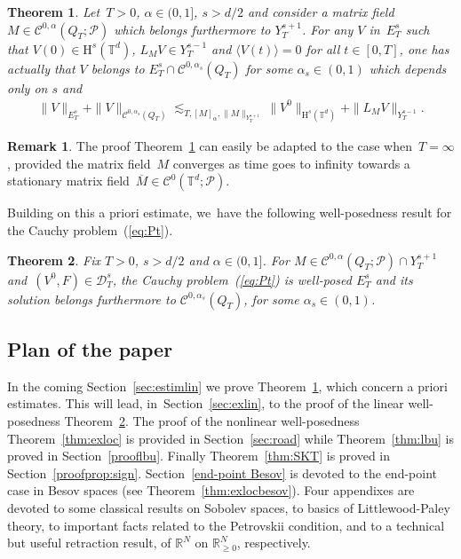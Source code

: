 \documentclass[JEP,XML,SOM,Unicode,published]{cedram}
\newtheorem{thm}{Theorem}
\theoremstyle{definition}
\newtheorem{rem}[prop]{Remark}
\newcommand\R{\mathbb{R}}
\newcommand\T{\mathbb{T}}
\renewcommand\H{\mathrm{H}}
\begin{document}
\begin{thm} \label{thm:PetrovskiiHs}
Let~$T>0$, $\alpha\in(0,1]$, $s>d/2$ and consider a matrix field $M\in\mathscr{C}^{0,\alpha}(Q_T;\mathscr{P})$ which belongs furthermore to $Y_T^{s+1}$. For any $V$ in~$E_T^s$ such that $V(0)\in\H^s(\T^d)$, $L_{M }V\in Y_T^{s-1}$ and $\langle V(t)\rangle=0$ for all $t\in[0,T]$, {one has actually} that $V$ belongs to $E_T^s\cap\mathscr{C}^{0,\alpha_s}(Q_T)$ for some $\alpha_s\in(0,1)$ which depends only on $s$ and
\begin{align}\label{thm2Hsestimate}
\| V \|_{E_T^s} + \|V\|_{\mathscr{C}^{0,\alpha_s}(Q_T)} \lesssim_{T,[M]_{\alpha},\|M\|_{Y_T^{s+1}}} \|V^0\|_{\H^s(\T^d)} + \|L_{M }V\|_{Y_T^{s-1}}.
\end{align}
\end{thm}

\begin{rem}\label{rem:no T dependence} The proof Theorem~\ref{thm:PetrovskiiHs} can easily be adapted to the case when~$T = \infty$, provided the matrix field~$M$ converges as time goes to infinity towards a stationary matrix field~$\overline M \in {\mathscr{C}^0}(\T^d;\mathscr{P})$.
\end{rem}

Building on this a priori estimate, we~have the following well-posedness result for the Cauchy problem~(\ref{eq:Pt}).
\begin{thm}\label{thm:exlin}
Fix $T>0$, $s>d/2$ and $\alpha\in(0,1]$. For $M\in\mathscr{C}^{0,\alpha}(Q_T;\mathscr{P})\cap Y_T^{s+1}$ and~$(V^0,F) \in \mathcal D_T^s$, the Cauchy problem~{\rm(\ref{eq:Pt})} is well-posed $E_T^s$ and its solution belongs furthermore to $\mathscr{C}^{0,\alpha_s}(Q_T)$, for some $\alpha_s\in(0,1)$.
\end{thm}
\subsection{Plan of the paper}
In the coming Section~\ref{sec:estimlin} we prove Theorem~\ref{thm:PetrovskiiHs}, which concern a priori estimates. This will lead, in~Section~\ref{sec:exlin}, to the proof of the linear well-posedness Theorem~\ref{thm:exlin}. The proof of the nonlinear well-posedness Theorem~\ref{thm:exloc}
is provided in Section~\ref{sec:road} while Theorem~\ref{thm:lbu} is proved in Section~\ref{prooflbu}. Finally Theorem~\ref{thm:SKT} is proved in Section~\ref{proofprop:sign}.
Section~\ref{end-point Besov} is devoted to the end-point case in Besov spaces (see Theorem~\ref{thm:exlocbesov}).
Four appendixes are devoted to some classical results on Sobolev spaces, to basics of Littlewood-Paley theory, to important facts related to the Petrovskii condition, and to a technical but useful retraction result, of $\R^N$ on $\R_{\geq 0}^N$, respectively.
\end{document}

